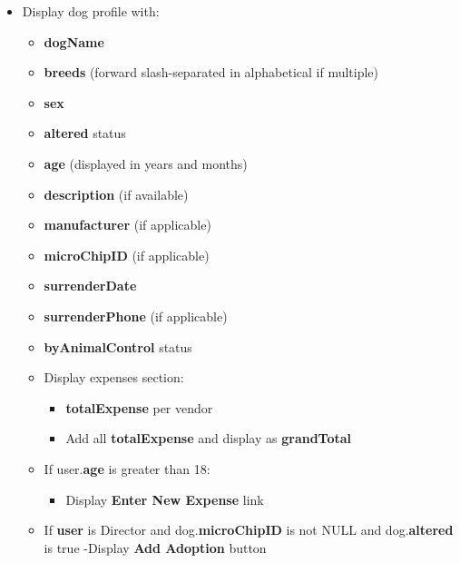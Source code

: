 \documentclass{article}
\begin{document}
\begin{itemize}
    \item Display dog profile with:
    \begin{itemize}
        \item \textbf{dogName}
        \item \textbf{breeds} (forward slash-separated in alphabetical if multiple)
        \item \textbf{sex}
        \item \textbf{altered} status
        \item \textbf{age} (displayed in years and months)
        \item \textbf{description} (if available)
        \item \textbf{manufacturer} (if applicable)
        \item \textbf{microChipID} (if applicable)
        \item \textbf{surrenderDate}
        \item \textbf{surrenderPhone} (if applicable)
        \item \textbf{byAnimalControl} status
        \item Display expenses section:
        \begin{itemize}
            \item \textbf{totalExpense} per vendor
            \item Add all \textbf{totalExpense} and display as \textbf{grandTotal}
        \end{itemize}
        \item If user.\textbf{age} is greater than 18:
        \begin{itemize}
            \item Display \textbf{Enter New Expense} link
        \end{itemize}
        \item If \textbf{user} is Director and dog.\textbf{microChipID} is not NULL and dog.\textbf{altered} is true -Display \textbf{Add Adoption} button
    \end{itemize}
\end{itemize}
\end{document}
